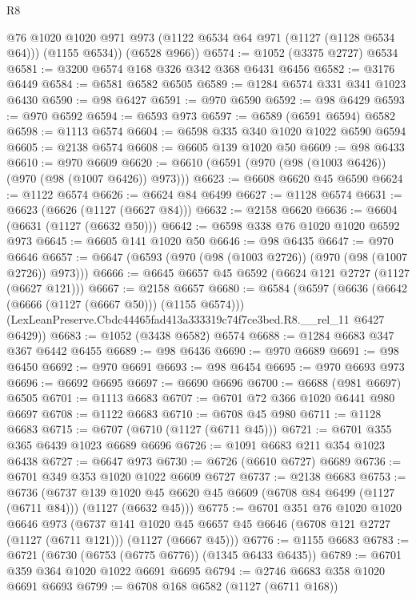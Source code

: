 \begin{lexlean}{R8}
\begin{coremodule}
        @76
        @1020
        @1020
        @971
        @973
        (@1122 @6534 @64 @971 (@1127 (@1128 @6534 @64)))
        (@1155 @6534))
      (@6528 @966))
@6574 := @1052 (@3375 @2727) @6534
@6581 := @3200 @6574 @168 @326 @342 @368 @6431 @6456
@6582 := @3176 @6449
@6584 := @6581 @6582 @6505
@6589 := @1284 @6574 @331 @341 @1023 @6430
@6590 := @98 @6427
@6591 := @970 @6590
@6592 := @98 @6429
@6593 := @970 @6592
@6594 := @6593 @973
@6597 := @6589 (@6591 @6594) @6582
@6598 := @1113 @6574
@6604 := @6598 @335 @340 @1020 @1022 @6590 @6594
@6605 := @2138 @6574
@6608 := @6605 @139 @1020 @50
@6609 := @98 @6433
@6610 := @970 @6609
@6620 := @6610 (@6591 (@970 (@98 (@1003 @6426)) (@970 (@98 (@1007 @6426)) @973)))
@6623 := @6608 @6620 @45 @6590
@6624 := @1122 @6574
@6626 := @6624 @84 @6499
@6627 := @1128 @6574
@6631 := @6623 (@6626 (@1127 (@6627 @84)))
@6632 := @2158 @6620
@6636 := @6604 (@6631 (@1127 (@6632 @50)))
@6642 := @6598 @338 @76 @1020 @1020 @6592 @973
@6645 := @6605 @141 @1020 @50
@6646 := @98 @6435
@6647 := @970 @6646
@6657 := @6647 (@6593 (@970 (@98 (@1003 @2726)) (@970 (@98 (@1007 @2726)) @973)))
@6666 := @6645 @6657 @45 @6592 (@6624 @121 @2727 (@1127 (@6627 @121)))
@6667 := @2158 @6657
@6680 := @6584
    (@6597
      (@6636 (@6642 (@6666 (@1127 (@6667 @50))) (@1155 @6574)))
      (LexLeanPreserve.Cbdc44465fad413a333319c74f7ce3bed.R8.__rel_11 @6427 @6429))
@6683 := @1052 (@3438 @6582) @6574
@6688 := @1284 @6683 @347 @367 @6442 @6455
@6689 := @98 @6436
@6690 := @970 @6689
@6691 := @98 @6450
@6692 := @970 @6691
@6693 := @98 @6454
@6695 := @970 @6693 @973
@6696 := @6692 @6695
@6697 := @6690 @6696
@6700 := @6688 (@981 @6697) @6505
@6701 := @1113 @6683
@6707 := @6701 @72 @366 @1020 @6441 @980 @6697
@6708 := @1122 @6683
@6710 := @6708 @45 @980
@6711 := @1128 @6683
@6715 := @6707 (@6710 (@1127 (@6711 @45)))
@6721 := @6701 @355 @365 @6439 @1023 @6689 @6696
@6726 := @1091 @6683 @211 @354 @1023 @6438
@6727 := @6647 @973
@6730 := @6726 (@6610 @6727) @6689
@6736 := @6701 @349 @353 @1020 @1022 @6609 @6727
@6737 := @2138 @6683
@6753 := @6736
    (@6737 @139 @1020 @45 @6620 @45 @6609 (@6708 @84 @6499 (@1127 (@6711 @84))) (@1127 (@6632 @45)))
@6775 := @6701
    @351
    @76
    @1020
    @1020
    @6646
    @973
    (@6737
      @141
      @1020
      @45
      @6657
      @45
      @6646
      (@6708 @121 @2727 (@1127 (@6711 @121)))
      (@1127 (@6667 @45)))
@6776 := @1155 @6683
@6783 := @6721 (@6730 (@6753 (@6775 @6776)) (@1345 @6433 @6435))
@6789 := @6701 @359 @364 @1020 @1022 @6691 @6695
@6794 := @2746 @6683 @358 @1020 @6691 @6693
@6799 := @6708 @168 @6582 (@1127 (@6711 @168))

\end{coremodule}
\end{lexlean}
